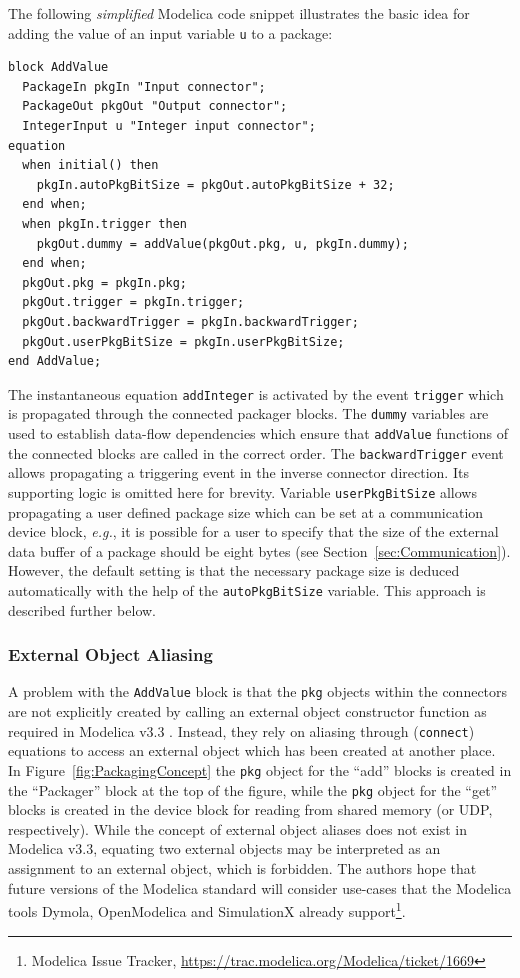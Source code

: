 \documentclass{resources/modelica}
\newcommand{\modelica}[1]{\lstinline[language=modelica]|#1|}
\begin{document}
The
following \emph{simplified} Modelica code snippet illustrates the basic idea for
adding the value of an input variable \modelica{u} to a package:
\begin{lstlisting}[language=modelica]
block AddValue
  PackageIn pkgIn "Input connector";
  PackageOut pkgOut "Output connector";
  IntegerInput u "Integer input connector";
equation
  when initial() then
    pkgIn.autoPkgBitSize = pkgOut.autoPkgBitSize + 32;
  end when;
  when pkgIn.trigger then
    pkgOut.dummy = addValue(pkgOut.pkg, u, pkgIn.dummy);
  end when;
  pkgOut.pkg = pkgIn.pkg;
  pkgOut.trigger = pkgIn.trigger;
  pkgOut.backwardTrigger = pkgIn.backwardTrigger;
  pkgOut.userPkgBitSize = pkgIn.userPkgBitSize;
end AddValue;
\end{lstlisting}
The instantaneous equation \modelica{addInteger} is activated by the event
\modelica{trigger} which is propagated through the connected packager blocks.
The \modelica{dummy} variables are used to establish data-flow dependencies
which ensure that \modelica{addValue} functions of the connected
blocks are called in the correct order. The \modelica{backwardTrigger} event
allows propagating a triggering event in the inverse connector direction.
Its supporting logic is omitted here for brevity. Variable
\modelica{userPkgBitSize} allows propagating a user defined package size which
can be set at a communication device block, \textit{e.g.}, it is possible for a
user to specify that the size of the external data buffer of a package should be eight bytes (see
Section~\ref{sec:Communication}). However,
the default setting is that the necessary package size is deduced automatically
with the help of the \modelica{autoPkgBitSize} variable. This approach is
described further below.

\subsubsection{External Object Aliasing}
\label{sec:External Object Aliasing}

A problem with the \modelica{AddValue} block is that the \modelica{pkg}
objects within the connectors are not explicitly created by calling an external object constructor
function as required in Modelica v3.3 \cite[p.\@~165]{ModelicaAssociation2014}.
Instead, they rely on aliasing through (\modelica{connect}) equations to
access an external object which has been created at another place. In
Figure~\ref{fig:PackagingConcept} the \modelica{pkg} object for the ``add''
blocks is created in the ``Packager'' block at the top of the figure, while the
\modelica{pkg} object for the ``get'' blocks is created in the device block for reading from
shared memory (or UDP, respectively). While the concept of external object
aliases does not exist in Modelica v3.3, equating two external
objects may be interpreted as an assignment to an external object,
which is forbidden. The authors hope that future versions of
the Modelica standard will consider use-cases that the
Modelica tools Dymola, OpenModelica and SimulationX already support\footnote{Modelica Issue Tracker,
\url{https://trac.modelica.org/Modelica/ticket/1669}}.
\end{document}
